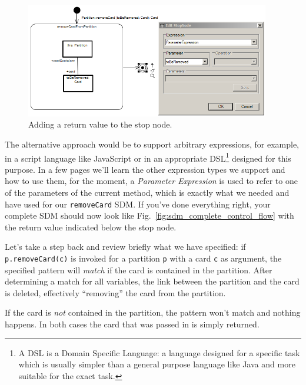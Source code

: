 \begin{figure}[htp]
\begin{center}
  \includegraphics[width=0.95\textwidth]{pics/sdmBilder/removeCard/sdm14RAW}
  \caption{Adding a return value to the stop node.}  
  \label{fig:stop_node_return_value}
\end{center}
\end{figure}

The alternative approach would be to support arbitrary expressions, for example, in a script language like JavaScript or in an appropriate DSL\footnote{A DSL is a Domain Specific Language: a language designed for a specific task which is usually simpler than a general purpose language like Java and more suitable for the exact task.} designed for this purpose. 
In a few pages we'll learn the other expression types
we support and how to use them, for the moment, a \emph{Parameter Expression} is used to refer to one of the parameters of the current method, which is exactly what we needed and have used for our \texttt{removeCard} SDM.
If you've done everything right, your complete SDM should now look like Fig.~\ref{fig:sdm_complete_control_flow} with the return value indicated below the stop node.

Let's take a step back and review briefly what we have specified:  if \texttt{p.remove\-Card(c)} is invoked for a partition \texttt{p} with a card \texttt{c} as argument, the specified pattern will \emph{match} if the card is contained in the partition.
After determining a match for all variables, the link between the partition and the card is deleted, effectively ``removing'' the card from the partition.  

If the card is \emph{not} contained in the partition, the pattern won't match and nothing happens. 
In both cases the card that was passed in is simply returned.

